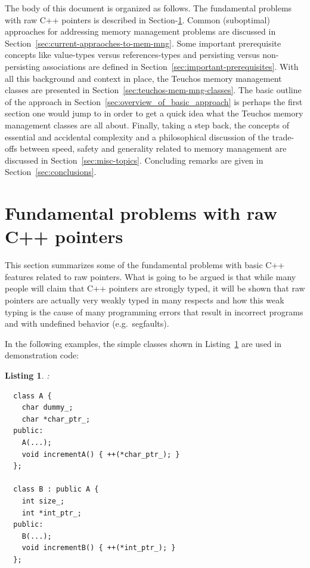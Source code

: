 \documentclass[pdf,ps2pdf,11pt]{SANDreport}
\newtheorem{listing}{Listing}
\begin{document}
The body of this document is organized as follows. The fundamental
problems with raw C++ pointers is described in
Section-\ref{sec:problems-with-raw-pointers}.  Common (suboptimal)
approaches for addressing memory management problems are discussed in
Section~\ref{sec:current-appraoches-to-mem-mng}.  Some important
prerequisite concepts like value-types versus references-types and
persisting versus non-persisting associations are defined in
Section~\ref{sec:important-prerequisites}.  With all this background
and context in place, the Teuchos memory management classes are
presented in Section~\ref{sec:teuchos-mem-mng-classes}.  The basic
outline of the approach in
Section~\ref{sec:overview_of_basic_approach} is perhaps the first
section one would jump to in order to get a quick idea what the
Teuchos memory management classes are all about.  Finally, taking a
step back, the concepts of essential and accidental complexity and a
philosophical discussion of the trade-offs between speed, safety and
generality related to memory management are discussed in
Section~\ref{sec:misc-topics}.  Concluding remarks are given in
Section~\ref{sec:conclusions}.


%
{}\section{Fundamental problems with raw C++ pointers}
\label{sec:problems-with-raw-pointers}
%

This section summarizes some of the fundamental problems with basic
C++ features related to raw pointers.  What is going to be argued is
that while many people will claim that C++ pointers are strongly
typed, it will be shown that raw pointers are actually very weakly
typed in many respects and how this weak typing is the cause of many
programming errors that result in incorrect programs and with
undefined behavior (e.g.\ segfaults).

In the following examples, the simple classes shown in
Listing~\ref{listing:Simple_A_B} are used in demonstration code:

\begin{listing}:\\
\label{listing:Simple_A_B}
{\small\begin{verbatim}
  class A {
    char dummy_;
    char *char_ptr_;
  public:
    A(...);
    void incrementA() { ++(*char_ptr_); }
  };

  class B : public A {
    int size_;
    int *int_ptr_;
  public:
    B(...);
    void incrementB() { ++(*int_ptr_); }
  };
\end{verbatim}}
\end{listing}
\end{document}
